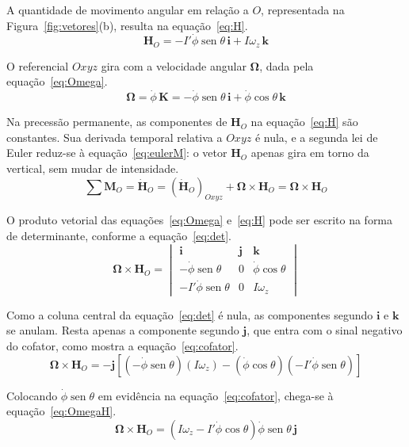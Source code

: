 \documentclass[12pt,a4paper]{article}
\newcommand{\vet}[1]{\mathbf{#1}}
\newcommand{\vOmega}{\boldsymbol{\Omega}}
\newcommand{\seno}{\operatorname{sen}}
\newcommand{\phid}{\dot{\phi}}
\begin{document}
A quantidade de movimento angular em relação a $O$, representada na Figura~\ref{fig:vetores}(b), resulta na equação~\ref{eq:H}.
\begin{equation}
\vet{H}_O = -I'\phid\seno\theta\,\vet{i} + I\omega_z\,\vet{k}
\label{eq:H}
\end{equation}

O referencial $Oxyz$ gira com a velocidade angular $\vOmega$, dada pela equação~\ref{eq:Omega}.
\begin{equation}
\vOmega = \phid\,\vet{K} = -\phid\seno\theta\,\vet{i} + \phid\cos\theta\,\vet{k}
\label{eq:Omega}
\end{equation}

Na precessão permanente, as componentes de $\vet{H}_O$ na equação~\ref{eq:H} são constantes. Sua derivada temporal relativa a $Oxyz$ é nula, e a segunda lei de Euler reduz-se à equação~\ref{eq:eulerM}: o vetor $\vet{H}_O$ apenas gira em torno da vertical, sem mudar de intensidade.
\begin{equation}
\sum\vet{M}_O = \dot{\vet{H}}_O = \left(\dot{\vet{H}}_O\right)_{Oxyz} + \vOmega\times\vet{H}_O = \vOmega\times\vet{H}_O
\label{eq:eulerM}
\end{equation}

O produto vetorial das equações~\ref{eq:Omega} e~\ref{eq:H} pode ser escrito na forma de determinante, conforme a equação~\ref{eq:det}.
\begin{equation}
\vOmega\times\vet{H}_O=
\begin{vmatrix}
\vet{i}&\vet{j}&\vet{k}\\
-\phid\seno\theta&0&\phid\cos\theta\\
-I'\phid\seno\theta&0&I\omega_z
\end{vmatrix}
\label{eq:det}
\end{equation}

Como a coluna central da equação~\ref{eq:det} é nula, as componentes segundo $\vet{i}$ e $\vet{k}$ se anulam. Resta apenas a componente segundo $\vet{j}$, que entra com o sinal negativo do cofator, como mostra a equação~\ref{eq:cofator}.
\begin{equation}
\vOmega\times\vet{H}_O=-\vet{j}\left[\left(-\phid\seno\theta\right)\left(I\omega_z\right)-\left(\phid\cos\theta\right)\left(-I'\phid\seno\theta\right)\right]
\label{eq:cofator}
\end{equation}

Colocando $\phid\seno\theta$ em evidência na equação~\ref{eq:cofator}, chega-se à equação~\ref{eq:OmegaH}.
\begin{equation}
\vOmega\times\vet{H}_O = \left(I\omega_z - I'\phid\cos\theta\right)\phid\seno\theta\,\vet{j}
\label{eq:OmegaH}
\end{equation}
\end{document}
